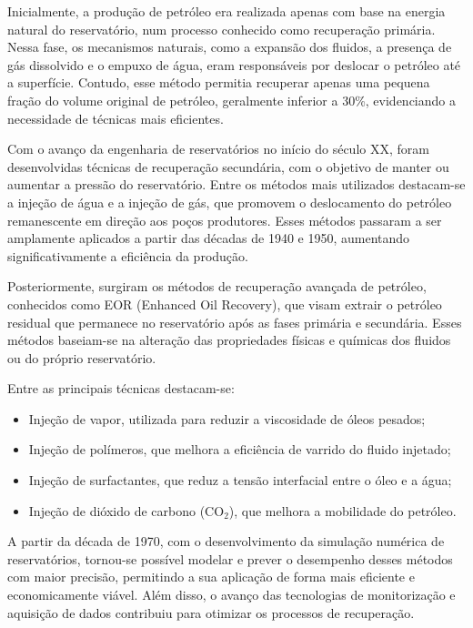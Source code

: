 \documentclass[12pt,a4paper]{report}
\begin{document}
Inicialmente, a produção de petróleo era realizada apenas com base na energia natural do reservatório, num processo conhecido como recuperação primária. Nessa fase, os mecanismos naturais, como a expansão dos fluidos, a presença de gás dissolvido e o empuxo de água, eram responsáveis por deslocar o petróleo até a superfície. Contudo, esse método permitia recuperar apenas uma pequena fração do volume original de petróleo, geralmente inferior a 30\%, evidenciando a necessidade de técnicas mais eficientes.

Com o avanço da engenharia de reservatórios no início do século XX, foram desenvolvidas técnicas de recuperação secundária, com o objetivo de manter ou aumentar a pressão do reservatório. Entre os métodos mais utilizados destacam-se a injeção de água e a injeção de gás, que promovem o deslocamento do petróleo remanescente em direção aos poços produtores. Esses métodos passaram a ser amplamente aplicados a partir das décadas de 1940 e 1950, aumentando significativamente a eficiência da produção.

Posteriormente, surgiram os métodos de recuperação avançada de petróleo, conhecidos como EOR (Enhanced Oil Recovery), que visam extrair o petróleo residual que permanece no reservatório após as fases primária e secundária. Esses métodos baseiam-se na alteração das propriedades físicas e químicas dos fluidos ou do próprio reservatório.

Entre as principais técnicas destacam-se:
\begin{itemize}
    \item Injeção de vapor, utilizada para reduzir a viscosidade de óleos pesados;
    \item Injeção de polímeros, que melhora a eficiência de varrido do fluido injetado;
    \item Injeção de surfactantes, que reduz a tensão interfacial entre o óleo e a água;
    \item Injeção de dióxido de carbono (CO$_2$), que melhora a mobilidade do petróleo.
\end{itemize}

A partir da década de 1970, com o desenvolvimento da simulação numérica de reservatórios, tornou-se possível modelar e prever o desempenho desses métodos com maior precisão, permitindo a sua aplicação de forma mais eficiente e economicamente viável. Além disso, o avanço das tecnologias de monitorização e aquisição de dados contribuiu para otimizar os processos de recuperação.
\end{document}
